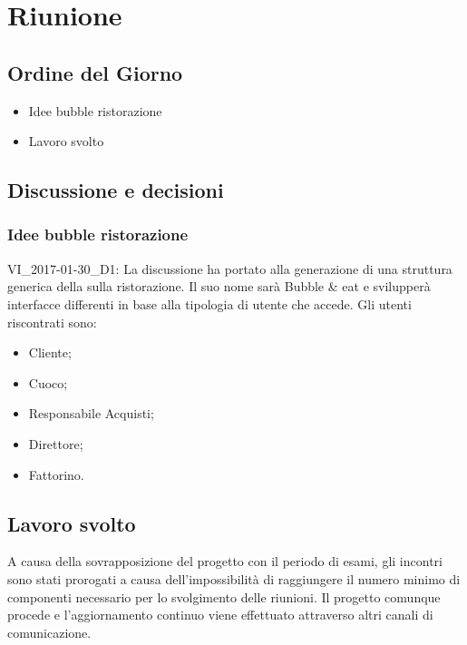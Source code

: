 
\section{Riunione}
\subsection{Ordine del Giorno}
\begin{itemize}
	\item Idee bubble ristorazione
	\item Lavoro svolto
\end{itemize}

\subsection{Discussione e decisioni}
\subsubsection{Idee bubble ristorazione}
VI\_2017-01-30\_D1: La discussione ha portato alla generazione di una struttura generica della  sulla ristorazione. Il suo nome sarà Bubble \& eat e svilupperà interfacce differenti in base alla tipologia di utente che accede.
Gli utenti riscontrati sono:
\begin{itemize}
	\item Cliente;
	\item Cuoco;
	\item Responsabile Acquisti;
	\item Direttore;
	\item Fattorino.
\end{itemize}

\subsection{Lavoro svolto}
A causa della sovrapposizione del progetto con il periodo di esami, gli incontri sono stati prorogati a causa dell'impossibilità di raggiungere il numero minimo di componenti necessario per lo svolgimento delle riunioni. Il progetto comunque procede e l'aggiornamento continuo viene effettuato attraverso altri canali di comunicazione.
 

\clearpage
